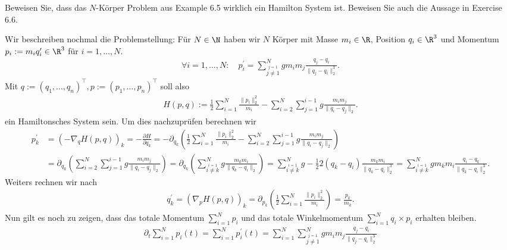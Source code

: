 \begin{exercise}
  Beweisen Sie, dass das $N$-Körper Problem aus Example 6.5
  wirklich ein Hamilton System ist. Beweisen Sie auch die
  Aussage in Exercise 6.6.
\end{exercise}

\begin{solution}
  Wir beschreiben nochmal die Problemstellung: Für $N \in \N$ haben wir $N$ Körper
  mit Masse $m_i \in \R$, Position $q_i \in \R^3$ und Momentum $p_i := m_iq_i^{\prime} \in \R^3$
  für $i = 1,\dots,N$.
  \begin{align*}
    \forall i = 1,\dots,N: \quad p_i^{\prime} = \sum_{\stackrel{j = 1}{j \neq 1}}^N gm_im_j \frac{q_j - q_i}{\|q_j - q_i\|_2^3}.
  \end{align*}
  Mit $q := (q_1,\dots,q_n)^{\top}, p := (p_1,\dots,p_n)^{\top}$ soll also
  \begin{align*}
    H(p,q) := \frac{1}{2}\sum_{i=1}^N \frac{\|p_i\|_2^2}{m_i}- \sum_{i = 2}^N\sum_{j=1}^{i-1}g\frac{m_im_j}{\|q_i-q_j\|_2}.
  \end{align*}
  ein Hamiltonsches System sein. Um dies nachzuprüfen berechnen wir
  \begin{align*}
    p_k^{\prime} &= \left(- \nabla_q H(p,q)\right)_k = - \frac{\partial H}{\partial q_k}
    = -\partial_{q_k}\left(\frac{1}{2}\sum_{i=1}^N \frac{\|p_i\|_2^2}{m_i}- \sum_{i = 2}^N\sum_{j=1}^{i-1}g\frac{m_im_j}{\|q_i-q_j\|_2}\right) \\
    &= \partial_{q_k}\left(\sum_{i = 2}^N\sum_{j=1}^{i-1}g\frac{m_im_j}{\|q_i-q_j\|_2}\right)
    = \partial_{q_k}\left(\sum_{\stackrel{i = 1}{i \neq k}}^{N}g\frac{m_km_i}{\|q_k-q_i\|_2}\right)
    = \sum_{\stackrel{i = 1}{i \neq k}}^{N}g-\frac{1}{2}2(q_k - q_i)\frac{m_km_i}{\|q_k-q_i\|_2^3}
    = \sum_{\stackrel{i = 1}{i \neq k}}^{N}gm_km_i\frac{q_i - q_k}{\|q_k-q_i\|_2^3}.
  \end{align*}
  Weiters rechnen wir nach
  \begin{align*}
    q_k^{\prime} = \left(\nabla_p H(p,q)\right)_k = \partial_{p_k}\left(\frac{1}{2}\sum_{i=1}^N \frac{\|p_i\|_2^2}{m_i}\right)
    = \frac{p_k}{m_k}.
  \end{align*}
  Nun gilt es noch zu zeigen, dass das totale Momentum $\sum_{i=1}^N p_i$
  und das totale Winkelmomentum $\sum_{i=1}^N q_i \times p_i$ erhalten bleiben.
  \begin{align*}
    \partial_t \sum_{i=1}^N p_i(t) = \sum_{i=1}^N p_i^{\prime}(t)
    = \sum_{i=1}^N \sum_{\stackrel{j = 1}{j \neq 1}}^N gm_im_j \frac{q_j - q_i}{\|q_j - q_i\|_2^3}

\end{align*}
\end{solution}
